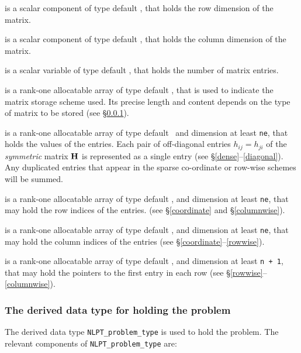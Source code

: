\documentclass{galahad}
\begin{document}
\begin{description}

 is a scalar component of type default \integer,
that holds the row dimension of the matrix.

 is a scalar component of type default \integer,
that holds the column dimension of the matrix.

 is a scalar variable of type default \integer, that
holds the number of matrix entries.

 is a rank-one allocatable array of type default \character, that
is used to indicate the matrix storage scheme used. Its precise length and
content depends on the type of matrix to be stored (see \S\ref{typeprob}).

 is a rank-one allocatable array of type default \realdp\,
and dimension at least {\tt ne}, that holds the values of the entries.
Each pair of off-diagonal entries $h_{ij} = h_{ji}$ of the {\em symmetric}
matrix ${\mathbf{H}}$ is represented as a single entry
(see \S\ref{dense}--\ref{diagonal}).
Any duplicated entries that appear in the sparse
co-ordinate or row-wise schemes will be summed.

 is a rank-one allocatable array of type default \integer,
and dimension at least {\tt ne}, that may hold the row indices of the entries.
(see \S\ref{coordinate} and \S\ref{columnwise}).

 is a rank-one allocatable array of type default \integer,
and dimension at least {\tt ne}, that may hold the column indices of the entries
(see \S\ref{coordinate}--\ref{rowwise}).

 is a rank-one allocatable array of type default \integer,
and dimension at least {\tt n + 1}, that may hold the pointers to
the first entry in each row (see \S\ref{rowwise}--\ref{columnwise}).

\end{description}


\subsubsection{The derived data type for holding the problem}\label{typeprob}
The derived data type {\tt NLPT\_problem\_type} is used to hold
the problem. The relevant components of
{\tt NLPT\_problem\_type}
are:
\end{document}
